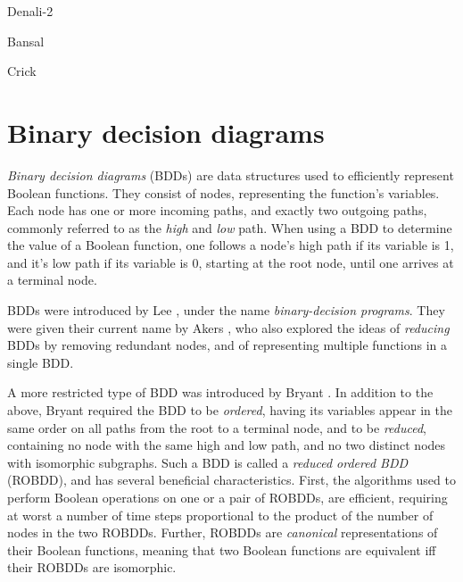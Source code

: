 \documentclass[a4paper,11pt]{kth-mag}
\begin{document}
Denali-2 \cite{joshi06}

Bansal \cite{bansal_thesis}

Crick \cite{crick_thesis}

\cite{aha}
\cite{pic}

\section{Binary decision diagrams}

\emph{Binary decision diagrams} (BDDs) are data structures used to efficiently represent Boolean functions.
They consist of nodes, representing the function's variables. Each node has one or more incoming paths, and exactly two outgoing paths, commonly referred to as the \emph{high} and \emph{low} path.
When using a BDD to determine the value of a Boolean function, one follows a node's high path if its variable is 1, and it's low path if its variable is 0, starting at the root node, until one arrives at a terminal node.

BDDs were introduced by Lee \cite{lee59}, under the name \emph{binary-decision programs}.
They were given their current name by Akers \cite{akers78}, who also explored the ideas of \emph{reducing} BDDs by removing redundant nodes, and of representing multiple functions in a single BDD.

A more restricted type of BDD was introduced by Bryant \cite{bryant86}.
In addition to the above, Bryant required the BDD to be \emph{ordered}, having its variables appear in the same order on all paths from the root to a terminal node,
and to be \emph{reduced}, containing no node with the same high and low path, and no two distinct nodes with isomorphic subgraphs.
Such a BDD is called a \emph{reduced ordered BDD} (ROBDD), and has several beneficial characteristics.
First, the algorithms used to perform Boolean operations on one or a pair of ROBDDs, are efficient, requiring at worst a number of time steps proportional to the product of the number of nodes in the two ROBDDs.
Further, ROBDDs are \emph{canonical} representations of their Boolean functions, meaning that two Boolean functions are equivalent iff their ROBDDs are isomorphic.
\end{document}
